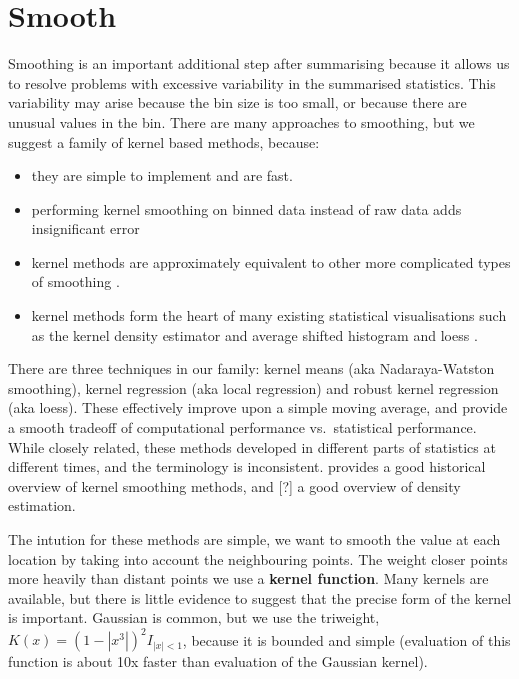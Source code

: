 \documentclass[journal]{vgtc}                %
\begin{document}
\section{Smooth}
\label{sec:smooth}

Smoothing is an important additional step after summarising because it allows us to resolve problems with excessive variability in the summarised statistics. This variability may arise because the bin size is too small, or because there are unusual values in the bin. There are many approaches to smoothing, but we suggest a family of kernel based methods, because:

\begin{itemize}
  \item they are simple to implement and are fast.
  
  \item performing kernel smoothing on binned data instead of raw data adds insignificant error \cite{wand:1994} 
  
  \item kernel methods are approximately equivalent to other more complicated types of smoothing \citep{silverman:1984}.
  
  \item kernel methods form the heart of many existing statistical visualisations such as the kernel density estimator \citep{scott:1992} and average shifted histogram \citep{scott:1985} and loess \citep{cleveland:1979}.

\end{itemize}

There are three techniques in our family: kernel means (aka Nadaraya-Watston smoothing), kernel regression (aka local regression) and robust kernel regression (aka loess). These effectively improve upon a simple moving average, and provide a smooth tradeoff of computational performance vs.\ statistical performance. While closely related, these methods developed in different parts of statistics at different times, and the terminology is inconsistent. \citep{cleveland:1996} provides a good historical overview of kernel smoothing methods, and [?] a good overview of density estimation.

The intution for these methods are simple, we want to smooth the value at each location by taking into account the neighbouring points. The weight closer points more heavily than distant points we use a {\bf kernel function}. Many kernels are available, but there is little evidence to suggest that the precise form of the kernel is important. Gaussian is common, but we use the triweight, $K(x) = (1 - |x^3|)^2 I_{|x| < 1}$, because it is bounded and simple (evaluation of this function is about 10x faster than evaluation of the Gaussian kernel).  
\end{document}
